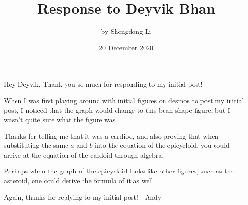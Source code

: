 \documentclass[12pt]{article}
\begin{document}
\title{Response to Deyvik Bhan}
\author{by Shengdong Li}
\date{20 December 2020}
\maketitle

Hey Deyvik, 
Thank you so much for responding to my initial post!

When I was first playing around with initial figures on desmos to post my initial post, I noticed that the graph would change to this bean-shape figure, but I wasn't quite sure what the figure was.

Thanks for telling me that it was a cardiod, and also proving that when substituting the same $a$ and $b$ into the equation of the epicycloid, you could arrive at the equation of the cardoid through algebra.

Perhaps when the graph of the epicycloid looks like other figures, such as the asteroid, one could derive the formula of it as well.

Again, thanks for replying to my initial post!
- Andy
\end{document}
